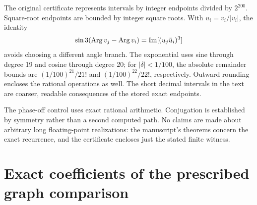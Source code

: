 \documentclass[11pt,a4paper]{article}
\numberwithin{equation}{section}
\theoremstyle{remark}\newtheorem{remark}[theorem]{Remark}
\begin{document}
The original certificate represents intervals by integer endpoints divided by $2^{200}$. Square-root endpoints are bounded by integer square roots. With $u_i=v_i/|v_i|$, the identity
\[
\sin3(\operatorname{Arg}v_j-\operatorname{Arg}v_i)=\operatorname{Im}[(u_j\bar u_i)^3]
\]
avoids choosing a different angle branch. The exponential uses sine through degree 19 and cosine through degree 20; for $|\delta|<1/100$, the absolute remainder bounds are $(1/100)^{21}/21!$ and $(1/100)^{22}/22!$, respectively. Outward rounding encloses the rational operations as well. The short decimal intervals in the text are coarser, readable consequences of the stored exact endpoints.

The phase-off control uses exact rational arithmetic. Conjugation is established by symmetry rather than a second computed path. No claims are made about arbitrary long floating-point realizations: the manuscript's theorems concern the exact recurrence, and the certificate encloses just the stated finite witness.

\section{Exact coefficients of the prescribed graph comparison}\label{app:coefficients}
\end{document}
